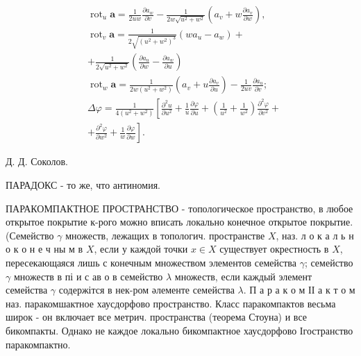 \documentclass[10pt]{article}
\begin{document}
\[

\begin{aligned}

& \operatorname{rot}_{u} \boldsymbol{a}=\frac{1}{2 u w} \frac{\partial a_{w}}{\partial v}-\frac{1}{2 w \sqrt{u^{2}+w^{2}}}\left(a_{v}+w \frac{\partial a_{v}}{\partial w}\right), \\

& \operatorname{rot}_{v} \boldsymbol{a}=\frac{1}{2 \sqrt{\left(u^{2}+w^{2}\right)^{3}}}\left(w a_{u}-a_{w}\right)+ \\

& +\frac{1}{2 \sqrt{u^{2}+w^{2}}}\left(\frac{\partial a_{u}}{\partial w}-\frac{\partial a_{w}}{\partial u}\right) \\

& \operatorname{rot}_{w} \boldsymbol{a}=\frac{1}{2 w\left(u^{2}+w^{2}\right)}\left(a_{v}+u \frac{\partial a_{v}}{\partial u}\right)-\frac{1}{2 u v} \frac{\partial a_{u}}{\partial v} ; \\

& \Delta \varphi=\frac{1}{4\left(u^{2}+w^{2}\right)}\left[\frac{\partial^{2} u}{\partial u^{2}}+\frac{1}{u} \frac{\partial \varphi}{\partial u}+\left(\frac{1}{u^{2}}+\frac{1}{w^{2}}\right) \frac{\partial^{2} \varphi}{\partial v^{2}}+\right. \\

& \left.+\frac{\partial^{2} \varphi}{\partial w^{2}}+\frac{1}{w} \frac{\partial \varphi}{\partial w}\right] \text {. }

\end{aligned}

\]



Д. Д. Соколов.



ПАРАДОКС - то же, что антиномия.



ПАРАКОМПАКТНОЕ ПРОСТРАНСТВО - топологическое пространство, в любое открытое покрытие к-рого можно вписать локально конечное открытое покрытие. (Семейство $\gamma$ множеств, лежащих в топологич. пространстве $X$, наз. л о к а л ь н о к о н е ч ны м в $X$, если у каждой точки $x \in X$ существует окрестность в $X$, пересекающаяся лишь с конечным множеством элементов семейства $\gamma$; семейство $\gamma$ множеств в пі и с ав о в семейство $\lambda$ множеств, если каждый элемент семейства $\gamma$ содержітся в нек-ром әлементе семейства $\lambda$. П а р а к о м ІІ а к т о м наз. паракомшактное хаусдорфово пространство. Класс паракомпактов весьма широк - он включает все метрич. пространства (теорема Стоуна) и все бикомпакты. Однако не каждое локально бикомпактное хаусдорфово Ігостранство паракомпактно.
\end{document}
